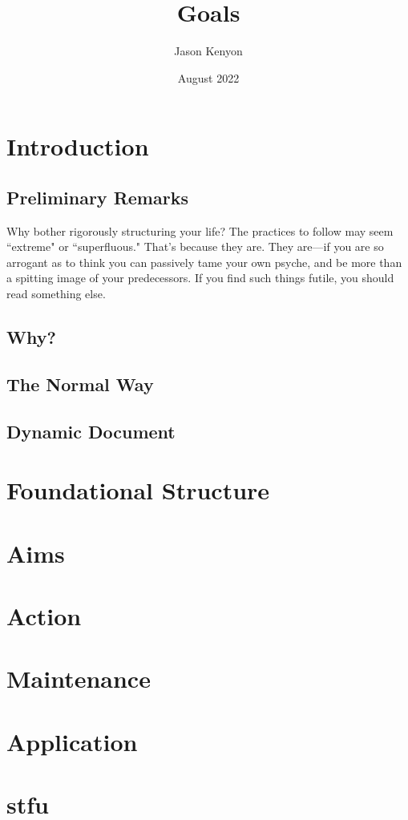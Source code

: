\documentclass{book}
\title{Goals}
\author{Jason Kenyon}
\date{August 2022}
\numberwithin{equation}{section}
\begin{document}
\maketitle
\tableofcontents

\chapter{Introduction}
\section{Preliminary Remarks}
Why bother rigorously structuring your life? The practices to follow may seem ``extreme" or ``superfluous." That's because they are. They are---if you are so arrogant as to think you can passively tame your own psyche, and be more than a spitting image of your predecessors. If you find such things futile, you should read something else. 

\section{Why?}

\section{The Normal Way}
\section{Dynamic Document}
\chapter{Foundational Structure}
\chapter{Aims}
\chapter{Action}
\chapter{Maintenance}
\chapter{Application}
\appendix
\chapter{stfu}
\end{document}
